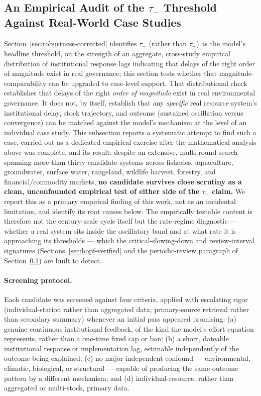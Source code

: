 \documentclass[twocolumn,10pt]{article}
\begin{document}
\subsection{An Empirical Audit of the $\tau_-$ Threshold Against Real-World Case Studies}
\label{sec:empirical-hunt}
Section~\ref{sec:robustness-corrected} identifies $\tau_-$ (rather than $\tau_+$) as the model's headline threshold, on the strength of an aggregate, cross-study empirical distribution of institutional response lags \cite{hocherman2025} indicating that delays of the right order of magnitude exist in real governance; this section tests whether that magnitude-comparability can be upgraded to case-level support. That distributional check establishes that delays of the right \emph{order of magnitude} exist in real environmental governance. It does not, by itself, establish that any \emph{specific} real resource system's institutional delay, stock trajectory, and outcome (sustained oscillation versus convergence) can be matched against the model's mechanism at the level of an individual case study. This subsection reports a systematic attempt to find such a case, carried out as a dedicated empirical exercise after the mathematical analysis above was complete, and its result: despite an extensive, multi-round search spanning more than thirty candidate systems across fisheries, aquaculture, groundwater, surface water, rangeland, wildlife harvest, forestry, and financial/commodity markets, \textbf{no candidate survives close scrutiny as a clean, unconfounded empirical test of either side of the $\tau_-$ claim.} We report this as a primary empirical finding of this work, not as an incidental limitation, and identify its root causes below. The empirically testable content is therefore not the century-scale cycle itself but the rate-regime diagnostic --- whether a real system sits inside the oscillatory band and at what rate it is approaching its thresholds --- which the critical-slowing-down and review-interval signatures (Sections~\ref{sec:hopf-verified} and the periodic-review paragraph of Section~\ref{sec:empirical-hunt}) are built to detect.

\paragraph{Screening protocol.} Each candidate was screened against four criteria, applied with escalating rigor (individual-station rather than aggregated data; primary-source retrieval rather than secondary summary) whenever an initial pass appeared promising: (a) genuine continuous institutional feedback, of the kind the model's effort equation represents, rather than a one-time fixed cap or ban; (b) a short, dateable institutional response or implementation lag, estimable independently of the outcome being explained; (c) no major independent confound --- environmental, climatic, biological, or structural --- capable of producing the same outcome pattern by a different mechanism; and (d) individual-resource, rather than aggregated or multi-stock, primary data.
\end{document}
